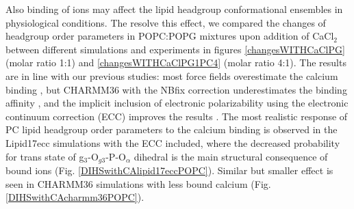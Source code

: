 \documentclass[aps,prl,superscriptaddress,twocolumn]{revtex4}
\begin{document}
Also binding of ions may affect the lipid headgroup conformational ensembles in physiological conditions.
The resolve this effect, we compared the changes of headgroup order parameters
in POPC:POPG mixtures 
upon addition of CaCl$_2$ between different simulations and experiments \cite{borle85,macdonald87}
in figures \ref{changesWITHCaClPG} (molar ratio 1:1) and \ref{changesWITHCaClPG1PC4} (molar ratio 4:1).
The results are in line with our previous studies:
most force fields overestimate the calcium binding \cite{catte16,antila19}, but CHARMM36 with the NBfix correction
underestimates the binding affinity \cite{antila19}, and the implicit inclusion of electronic polarizability
using the electronic continuum correction (ECC) improves the results \cite{melcr18,melcr20}.
The most realistic response of PC lipid headgroup order parameters to the calcium binding
is observed in the Lipid17ecc simulations with the ECC included, where
the decreased probability for trans state of g$_3$-O$_{g3}$-P-O$_\alpha$ dihedral
is the main structural consequence of bound ions (Fig. \ref{DIHSwithCAlipid17eccPOPC}).
Similar but smaller effect is seen in CHARMM36 simulations with less bound calcium (Fig. \ref{DIHSwithCAcharmm36POPC}).





\end{document}
